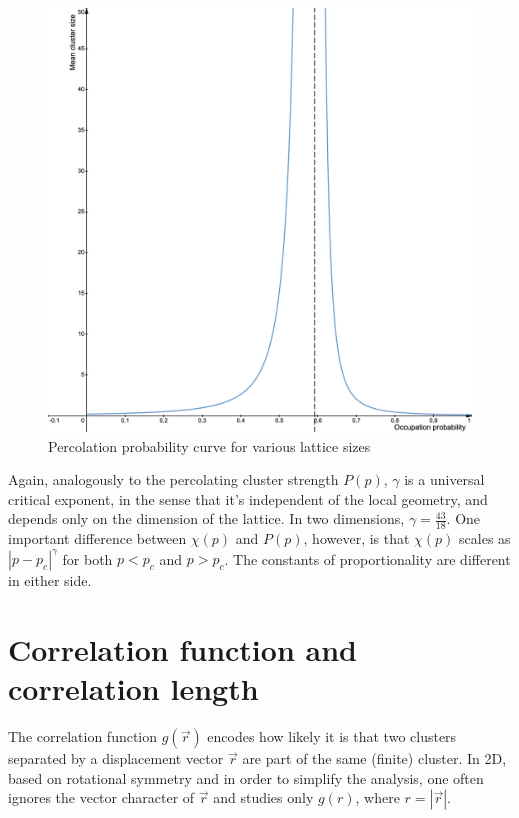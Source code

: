 \begin{figure}[H]
  \includegraphics[width=\linewidth]{Images/sec2_mean_cluster_size_1.png}
  \caption{Percolation probability curve for various lattice sizes}
  \label{fig:sec2_mean_cluster_size_1}
\end{figure}


Again, analogously to the percolating cluster strength $P(p)$, $\gamma$ is a universal critical exponent, in the sense that it's independent of the local geometry, and depends only on the dimension of the lattice. In two dimensions, $\gamma = \frac{43}{18}$. One important difference between $\chi(p)$ and $P(p)$, however, is that $\chi(p)$ scales as $|p - p_c|^\gamma$ for both $p < p_c$ and $p > p_c$. The constants of proportionality are different in either side.


\section{Correlation function and correlation length} 

The correlation function $g(\vec{r})$ encodes how likely it is that two clusters separated by a displacement vector $\vec{r}$ are part of the same (finite) cluster. In 2D,  based on rotational symmetry and in order to simplify the analysis, one often ignores the vector character of  $\vec{r}$ and studies only $g(r)$, where $r = |\vec{r}|$.


